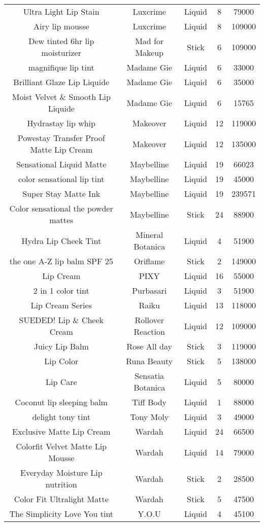 \begin{table}[htbp]
\begin{tabular}{ccccc}
Ultra Light Lip Stain & Luxcrime & Liquid & 8 & 79000 \\ 
Airy lip mousse & Luxcrime & Liquid & 8 & 109000 \\ 
Dew tinted 6hr lip moisturizer & Mad for Makeup & Stick & 6 & 109000 \\ 
magnifique lip tint & Madame Gie & Liquid & 6 & 33000 \\ 
Brilliant Glaze Lip Liquide & Madame Gie & Liquid & 6 & 35000 \\ 
Moist Velvet \& Smooth Lip Liquide & Madame Gie & Liquid & 6 & 15765 \\ 
Hydrastay lip whip & Makeover & Liquid & 12 & 119000 \\ 
Powestay Transfer Proof Matte Lip Cream & Makeover & Liquid & 12 & 135000 \\ 
Sensational Liquid Matte & Maybelline & Liquid & 19 & 66023 \\ 
color sensational lip tint & Maybelline & Liquid & 19 & 45000 \\ 
Super Stay Matte Ink & Maybelline & Liquid & 19 & 239571 \\ 
Color sensational the powder mattes & Maybelline & Stick & 24 & 88900 \\ 
Hydra Lip Cheek Tint & Mineral Botanica & Liquid & 4 & 51900 \\ 
the one A-Z lip balm SPF 25 & Oriflame & Stick & 2 & 149000 \\ 
Lip Cream & PIXY & Liquid & 16 & 55000 \\ 
2 in 1 color tint & Purbasari & Liquid & 3 & 51900 \\ 
Lip Cream Series & Raiku & Liquid & 13 & 118000 \\ 
SUEDED! Lip \& Cheek Cream & Rollover Reaction & Liquid & 12 & 109000 \\ 
Juicy Lip Balm & Rose All day & Stick & 3 & 119000 \\ 
Lip Color & Runa Beauty & Stick & 5 & 138000 \\ 
Lip Care & Sensatia Botanica & Liquid & 5 & 80000 \\ 
Coconut lip sleeping balm & Tiff Body & Liquid & 1 & 88000 \\ 
delight tony tint & Tony Moly & Liquid & 3 & 49000 \\ 
Exclusive Matte Lip Cream & Wardah & Liquid & 24 & 66500 \\ 
Colorfit Velvet Matte Lip Mousse & Wardah & Liquid & 14 & 79000 \\ 
Everyday Moisture Lip nutrition & Wardah & Stick & 2 & 28500 \\ 
Color Fit Ultralight Matte & Wardah & Stick & 5 & 47500 \\ 
The Simplicity Love You tint & Y.O.U & Liquid & 4 & 45100 \\ 
\end{tabular}
\end{table}
\restoregeometry